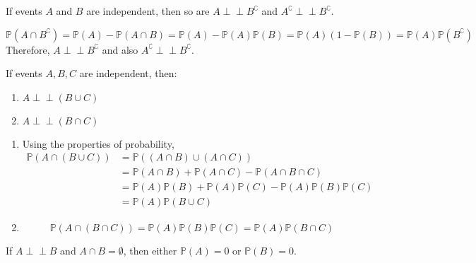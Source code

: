 \documentclass{huhtakm-template-book}
\newcommand{\independent}{\perp\!\!\!\perp}
\newcommand{\prob}{\mathbb{P}}
\begin{document}
    \begin{prop}
        If events $A$ and $B$ are independent, then so are $A\independent B^{\complement}$ and $A^{\complement}\independent B^{\complement}$.
    \end{prop}
    \begin{proofing}
        \begin{equation*}
            \prob(A\cap B^{\complement})=\prob(A)-\prob(A\cap B)=\prob(A)-\prob(A)\prob(B)=\prob(A)(1-\prob(B))=\prob(A)\prob(B^{\complement})
        \end{equation*}
        Therefore, $A\independent B^{\complement}$ and also $A^{\complement}\independent B^{\complement}$.
    \end{proofing}
    \begin{prop}
        If events $A,B,C$ are independent, then:
        \begin{enumerate}
            \item $A\independent(B\cup C)$
            \item $A\independent(B\cap C)$
        \end{enumerate}
    \end{prop}
    \begin{proofing}
        \begin{enumerate}
            \item Using the properties of probability,
            \begin{align*}
                \prob(A\cap(B\cup C))&=\prob((A\cap B)\cup(A\cap C))\\
                &=\prob(A\cap B)+\prob(A\cap C)-\prob(A\cap B\cap C)\\
                &=\prob(A)\prob(B)+\prob(A)\prob(C)-\prob(A)\prob(B)\prob(C)\\
                &=\prob(A)\prob(B\cup C)
            \end{align*}
            \item
            \begin{equation*}
                \prob(A\cap(B\cap C))=\prob(A)\prob(B)\prob(C)=\prob(A)\prob(B\cap C)
            \end{equation*}
        \end{enumerate}
    \end{proofing}
    \begin{rem}
        If $A\independent B$ and $A\cap B=\emptyset$, then either $\prob(A)=0$ or $\prob(B)=0$.
    \end{rem}

\newpage
\end{document}
